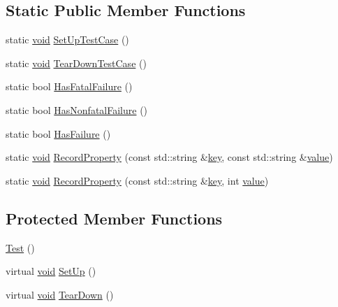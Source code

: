 \subsection*{Static Public Member Functions}
\begin{DoxyCompactItemize}
\item 
static \hyperlink{legacy_8hpp_a8bb47f092d473522721002c86c13b94e}{void} \hyperlink{classtesting_1_1Test_a5ccbac42fee8c5b00b0bfe89b6c49d79}{Set\-Up\-Test\-Case} ()
\item 
static \hyperlink{legacy_8hpp_a8bb47f092d473522721002c86c13b94e}{void} \hyperlink{classtesting_1_1Test_af374706cbaf0ffc460f4fd04e7c150f1}{Tear\-Down\-Test\-Case} ()
\item 
static bool \hyperlink{classtesting_1_1Test_a0a89846458f0e8ed1c9457c957e8182a}{Has\-Fatal\-Failure} ()
\item 
static bool \hyperlink{classtesting_1_1Test_a07e896f1b1836f8ac075c26d7b7c9fb8}{Has\-Nonfatal\-Failure} ()
\item 
static bool \hyperlink{classtesting_1_1Test_a7a00be7dd0a6bfdc8d47a1b784623613}{Has\-Failure} ()
\item 
static \hyperlink{legacy_8hpp_a8bb47f092d473522721002c86c13b94e}{void} \hyperlink{classtesting_1_1Test_ae0448aec9e389fab70f6a75a59ff6aa2}{Record\-Property} (const std\-::string \&\hyperlink{core__c_8h_a68cf695b604d08c0b6f6f6bb282a6586}{key}, const std\-::string \&\hyperlink{highgui__c_8h_ad4670c92695d4327c21292905a803901}{value})
\item 
static \hyperlink{legacy_8hpp_a8bb47f092d473522721002c86c13b94e}{void} \hyperlink{classtesting_1_1Test_af602903efb17730b977304fc56500881}{Record\-Property} (const std\-::string \&\hyperlink{core__c_8h_a68cf695b604d08c0b6f6f6bb282a6586}{key}, int \hyperlink{highgui__c_8h_ad4670c92695d4327c21292905a803901}{value})
\end{DoxyCompactItemize}
\subsection*{Protected Member Functions}
\begin{DoxyCompactItemize}
\item 
\hyperlink{classtesting_1_1Test_a68b7618abd1fc6d13382738b0d3b5c7c}{Test} ()
\item 
virtual \hyperlink{legacy_8hpp_a8bb47f092d473522721002c86c13b94e}{void} \hyperlink{classtesting_1_1Test_a8b38992669fb844864807cf32e416853}{Set\-Up} ()
\item 
virtual \hyperlink{legacy_8hpp_a8bb47f092d473522721002c86c13b94e}{void} \hyperlink{classtesting_1_1Test_aab3c02c9f81afe1357adfc45afccd474}{Tear\-Down} ()
\end{DoxyCompactItemize}
